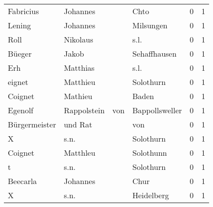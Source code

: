 \begin{tabular}{llllrr}
                Fabricius &                           Johannes &             &                                        Chto &          0 &         1 \\
                   Lening &                           Johannes &             &                                   Milsungen &          0 &         1 \\
                     Roll &                           Nikolaus &             &                                        s.l. &          0 &         1 \\
                   Büeger &                              Jakob &             &                                Sehaffhausen &          0 &         1 \\
                      Erh &                           Matthias &             &                                        s.l. &          0 &         1 \\
                   eignet &                           Matthieu &             &                                   Solothurn &          0 &         1 \\
                  Coignet &                            Mathieu &             &                                       Baden &          0 &         1 \\
                  Egenolf &                        Rappolstein &         von &                              Bappollsweller &          0 &         1 \\
            Bürgermeister &                            und Rat &             &                                         von &          0 &         1 \\
                        X &                               s.n. &             &                                   Solothurn &          0 &         1 \\
                  Coignet &                           Matthleu &             &                                   Solothunn &          0 &         1 \\
                        t &                               s.n. &             &                                   Solothurn &          0 &         1 \\
                 Beecarla &                           Johannes &             &                                        Chur &          0 &         1 \\
                        X &                               s.n. &             &                                  Heidelberg &          0 &         1 \\

\end{tabular}
